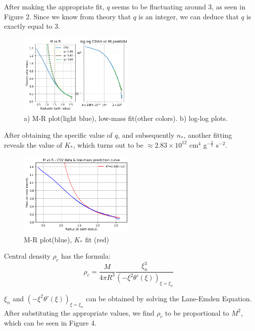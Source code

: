 \documentclass[aps,twocolumn,showpacs,preprintnumbers,nofootinbib,prl,superscriptaddress,groupedaddress]{revtex4-2}
\begin{document}
\begin{enumerate}[label=(\alph*)]
    After making the appropriate fit, $q$ seems to be fluctuating around $3$, as seen in Figure 2. Since we know from theory that $q$ is an integer, we can deduce that $q$ is exactly equal to 3.
    \begin{figure}[H] 
    \centering
    \includegraphics[width=0.5\textwidth]{mrq.png}
    \caption{a) M-R plot(light blue), low-mass fit(other colors). b) log-log plots.}
    \end{figure}
    
    After obtaining the specific value of $q$, and subsequently $n_{*}$, another fitting reveals the value of $K_{*}$, which turns out to be $\approx 2.83 \times 10^{12}$ cm$^{4}$ g$^{-\frac{2}{3}}$ s$^{-2}$. 
    
    \begin{figure}[H] 
    \centering
    \includegraphics[width=0.5\textwidth]{Kval.png}
    \caption{M-R plot(blue), $K_{*}$ fit (red)}
    \end{figure}
    
    Central density $\rho_{c}$ has the formula:
    \begin{equation}
        \rho_{c} = \frac{M}{4\pi R^{3}} \frac{\xi_{n}^{3}}{\left(-\xi^{2} \theta'(\xi)\right)_{\xi=\xi_{n}}}
    \end{equation}
    
    $\xi_{n}$ and $\left(-\xi^{2} \theta'(\xi)\right)_{\xi=\xi_{n}}$ can be obtained by solving the Lane-Emden Equation. After substituting the appropriate values, we find $\rho_{c}$ to be proportional to $M^2$, which can be seen in Figure 4.
    

\end{enumerate}
\end{document}

